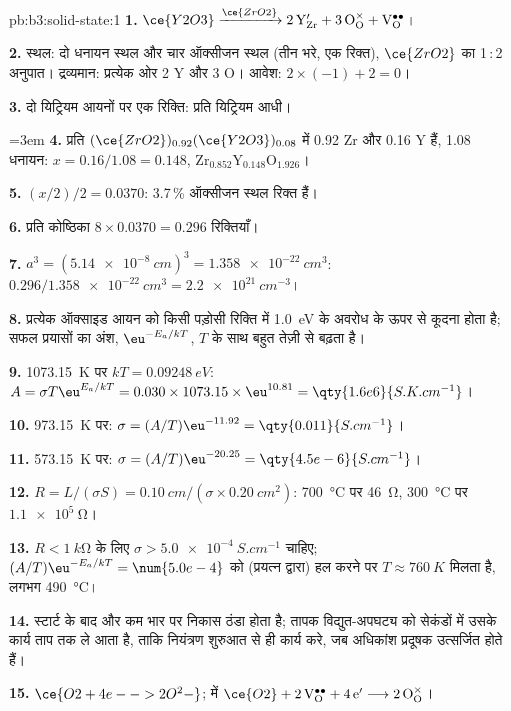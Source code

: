\begin{solution}{pb:b3:solid-state:1}
\textbf{1.} $\ce{Y2O3} \xrightarrow{\ce{ZrO2}} \mathrm{2\,Y_{Zr}' + 3\,O_O^{\times} + V_O^{\bullet\bullet}}$।

\textbf{2.} स्थल: दो धनायन स्थल और चार ऑक्सीजन स्थल (तीन भरे, एक रिक्त),
$\ce{ZrO2}$ का 1\,:\,2 अनुपात। द्रव्यमान: प्रत्येक ओर 2 Y और 3 O। आवेश: $2 \times (-1) + 2 = 0$।

\textbf{3.} दो यिट्रियम आयनों पर एक रिक्ति: प्रति यिट्रियम आधी।

\emergencystretch=3em \textbf{4.} प्रति $(\ce{ZrO2})_{0.92}(\ce{Y2O3})_{0.08}$ में 0.92 Zr और 0.16 Y हैं, 1.08 धनायन: $x = 0.16/1.08 = 0.148$,
$\mathrm{Zr_{0.852}Y_{0.148}O_{1.926}}$।

\textbf{5.} $(x/2)/2 = 0.0370$: 3.7\,\% ऑक्सीजन स्थल रिक्त हैं।

\textbf{6.} प्रति कोष्ठिका $8 \times 0.0370 = 0.296$ रिक्तियाँ।

\textbf{7.} $a^3 = (\qty{5.14e-8}{cm})^3 = \qty{1.358e-22}{cm^3}$: $0.296/\qty{1.358e-22}{cm^3} = \qty{2.2e21}{cm^{-3}}$।

\textbf{8.} प्रत्येक ऑक्साइड आयन को किसी पड़ोसी रिक्ति में \qty{1.0}{eV} के अवरोध के ऊपर से
कूदना होता है; सफल प्रयासों का अंश, $\eu^{-E_a/kT}$, $T$ के साथ बहुत तेज़ी से बढ़ता है।

\textbf{9.} \qty{1073.15}{K} पर $kT = \qty{0.09248}{eV}$: $A = \sigma T\eu^{E_a/kT} = 0.030 \times 1073.15 \times \eu^{10.81} = \qty{1.6e6}{S.K.cm^{-1}}$।

\textbf{10.} \qty{973.15}{K} पर: $\sigma = (A/T)\eu^{-11.92} = \qty{0.011}{S.cm^{-1}}$।

\textbf{11.} \qty{573.15}{K} पर: $\sigma = (A/T)\eu^{-20.25} = \qty{4.5e-6}{S.cm^{-1}}$।

\textbf{12.} $R = L/(\sigma S) = \qty{0.10}{cm}/(\sigma \times \qty{0.20}{cm^2})$: \qty{700}{\celsius} पर \qty{46}{\ohm}, \qty{300}{\celsius} पर $\qty{1.1e5}{\ohm}$।

\textbf{13.} $R < \qty{1}{k\ohm}$ के लिए $\sigma > \qty{5.0e-4}{S.cm^{-1}}$ चाहिए; $(A/T)\eu^{-E_a/kT} = \num{5.0e-4}$ को (प्रयत्न द्वारा) हल करने पर
$T \approx \qty{760}{K}$ मिलता है, लगभग \qty{490}{\celsius}।

\textbf{14.} स्टार्ट के बाद और कम भार पर निकास ठंडा होता है; तापक
विद्युत-अपघट्य को सेकंडों में उसके कार्य ताप तक ले आता है, ताकि नियंत्रण
शुरुआत से ही कार्य करे, जब अधिकांश प्रदूषक उत्सर्जित होते हैं।

\textbf{15.} $\ce{O2 + 4e- -> 2O^2-}$;  में $\ce{O2} + \mathrm{2\,V_O^{\bullet\bullet} + 4\,e'} \longrightarrow \mathrm{2\,O_O^{\times}}$।


\end{solution}
